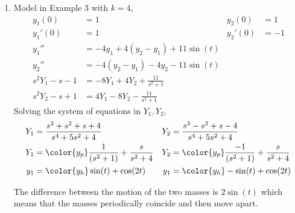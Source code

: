 \begin{enumerate}
    \item Model in Example 3 with $ k = 4 $,
          \begin{align}
              y_1(0)         & = 1                                 &
              y_2(0)         & = 1                                   \\
              y_1'(0)        & = 1                                 &
              y_2'(0)        & = -1                                  \\
              y_1''          & = -4y_1 + 4(y_2 - y_1) + 11\sin(t)    \\
              y_2''          & = -4(y_2 - y_1) - 4y_2 - 11\sin(t)    \\
              s^2Y_1 - s - 1 & = -8Y_1 + 4Y_2 + \frac{11}{s^2 + 1}   \\
              s^2Y_2 - s + 1 & = 4Y_1 - 8Y_2 - \frac{11}{s^2 + 1}
          \end{align}
          Solving the system of equations in $ Y_1, Y_2 $,
          \begin{align}
              Y_1 & = \frac{s^3 + s^2 + s + 4}{s^4 + 5s^2 + 4}             &
              Y_2 & = \frac{s^3 - s^2 + s - 4}{s^4 + 5s^2 + 4}               \\
              Y_1 & = \color{y_p} \frac{1}{(s^2 + 1)} + \frac{s}{s^2 + 4}  &
              Y_2 & = \color{y_p} \frac{-1}{(s^2 + 1)} + \frac{s}{s^2 + 4}   \\
              y_1 & = \color{y_h} \sin(t) + \cos(2t)                       &
              y_1 & = \color{y_h} -\sin(t) + \cos(2t)
          \end{align}
          \begin{figure}[H]
              \centering
          \end{figure}
          The difference between the motion of the two masses is $ 2\sin(t) $ which
          means that the masses periodically coincide and then move apart.


\end{enumerate}
